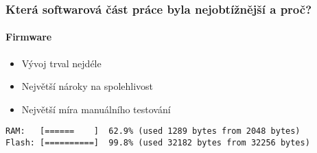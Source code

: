 \documentclass[
    utf8,
    aspectratio=169,
    17pt,  %
]{beamer}
\begin{document}
\begin{frame}[fragile]
    \frametitle{Která softwarová část práce byla nejobtížnější a proč?}
    \framesubtitle{Firmware}
    \begin{itemize}
        \item Vývoj trval nejdéle
        \item Největší nároky na spolehlivost
        \item Největší míra manuálního testování
    \end{itemize}
    {
        \footnotesize
        \begin{lstlisting}[style=terminal]
RAM:   [======    ]  62.9% (used 1289 bytes from 2048 bytes)
Flash: [==========]  99.8% (used 32182 bytes from 32256 bytes)
        \end{lstlisting}
    }
\end{frame}
\end{document}
